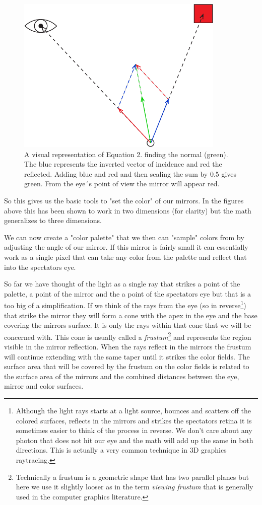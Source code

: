 \documentclass{article}
\begin{document}
\begin{figure}[ht!]
\centering
\includegraphics{images/finding-normal.png}
\caption{A visual representation of Equation 2. finding the normal (green). The blue represents the inverted vector of incidence and red the reflected. Adding blue and red and then scaling the sum by 0.5 gives green. From the eye´s point of view the mirror will appear red.}
\end{figure}


So this gives us the basic tools to "set the color" of our mirrors. In
the figures above this has been shown to work in two dimensions (for
clarity) but the math generalizes to three dimensions.

We can now create a "color palette" that we then can "sample" colors
from by adjusting the angle of our mirror. If this mirror is fairly
small it can essentially work as a single pixel that can take any color
from the palette and reflect that into the spectators eye.

So far we have thought of the light as a single ray that strikes a point
of the palette, a point of the mirror and the a point of the spectators
eye but that is a too big of a simplification. If we think of the rays
from the eye (so in reverse\footnote{Although the light rays starts at a
  light source, bounces and scatters off the colored surfaces, reflects
  in the mirrors and strikes the spectators retina it is sometimes
  easier to think of the process in reverse. We don't care about any
  photon that does not hit our eye and the math will add up the same in
  both directions\footnotemark{}. This is actually a very common
  technique in 3D graphics raytracing.}) that strike the mirror they
will form a cone with the apex in the eye and the base covering the
mirrors surface. It is only the rays within that cone that we will be
concerned with. This cone is usually called a \emph{frustum}\footnote{Technically
  a frustum is a geometric shape that has two parallel planes but here
  we use it slightly looser as in the term \emph{viewing frustum} that is generally used
  in the computer graphics literature.} and represents the region
visible in the mirror reflection. When the rays reflect in the mirrors
the frustum will continue extending with the same taper until it strikes
the color fields. The surface area that will be covered by the frustum
on the color fields is related to the surface area of the mirrors and
the combined distances between the eye, mirror and color surfaces.
\end{document}
